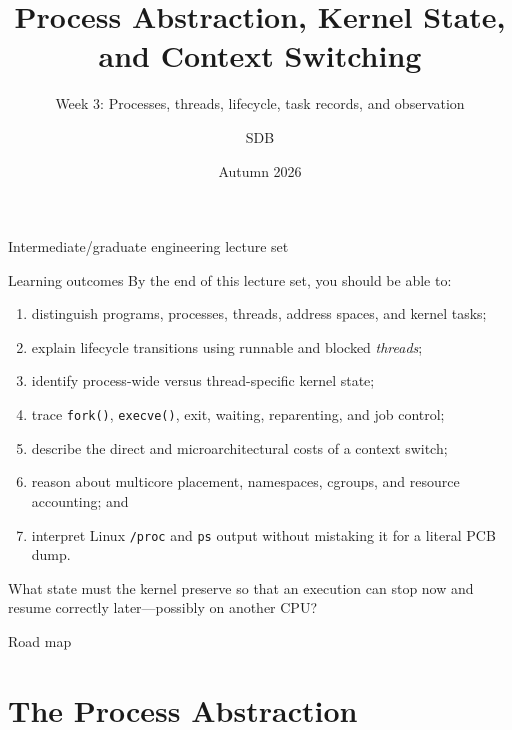 \documentclass[aspectratio=169,11pt]{beamer}
\title[Processes and Kernel State]{Process Abstraction, Kernel State, and Context Switching}
\subtitle{Week 3: Processes, threads, lifecycle, task records, and observation}
\author[SDB]{SDB}
\date{Autumn 2026}
\newcommand{\code}[1]{\texttt{#1}}
\begin{document}
\begin{frame}
  \titlepage
  \vspace{-1.2em}
  \begin{center}
    \small Intermediate/graduate engineering lecture set
  \end{center}
\end{frame}

\begin{frame}{Learning outcomes}
  By the end of this lecture set, you should be able to:
  \begin{enumerate}
    \item distinguish programs, processes, threads, address spaces, and kernel tasks;
    \item explain lifecycle transitions using runnable and blocked \emph{threads};
    \item identify process-wide versus thread-specific kernel state;
    \item trace \code{fork()}, \code{execve()}, exit, waiting, reparenting, and job control;
    \item describe the direct and microarchitectural costs of a context switch;
    \item reason about multicore placement, namespaces, cgroups, and resource accounting; and
    \item interpret Linux \code{/proc} and \code{ps} output without mistaking it for a literal PCB dump.
  \end{enumerate}
  \begin{tcolorbox}[title=Guiding question,colback=osorange!5,colframe=osorange!70]
    What state must the kernel preserve so that an execution can stop now and resume correctly later---possibly on another CPU?
  \end{tcolorbox}
\end{frame}

\begin{frame}{Road map}
  \tableofcontents
\end{frame}

\section{The Process Abstraction}
\end{document}
